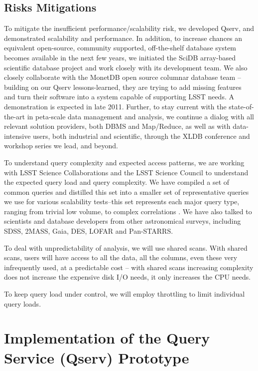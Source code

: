 \documentclass[DM,lsstdraft,toc]{lsstdoc}
\begin{document}
\subsection{Risks Mitigations}\label{risks-mitigations}

To mitigate the insufficient performance/scalability risk, we developed
Qserv, and demonstrated scalability and performance. In addition, to
increase chances an equivalent open-source, community supported,
off-the-shelf database system becomes available in the next few years,
we initiated the SciDB array-based scientific database project and work
closely with its development team. We also closely collaborate with the
MonetDB open source columnar database team -- building on our Qserv
lessons-learned, they are trying to add missing features and turn their
software into a system capable of supporting LSST needs. A demonstration
is expected in late 2011. Further, to stay current with the
state-of-the-art in peta-scale data management and analysis, we continue
a dialog with all relevant solution providers, both DBMS and Map/Reduce,
as well as with data-intensive users, both industrial and scientific,
through the XLDB conference and workshop series
we lead, and beyond.

To understand query complexity and expected access patterns, we are
working with LSST Science Collaborations and the LSST Science Council to
understand the expected query load and query complexity. We have
compiled a set of common queries \citep{CommonQueries} and distilled
this set into a smaller set of representative queries we use for various
scalability tests--this set represents each major query type, ranging
from trivial low volume, to complex correlations \citep{PerfTests}. We
have also talked to scientists and database developers from other
astronomical surveys, including SDSS, 2MASS, Gaia, DES, LOFAR and
Pan-STARRS.

To deal with unpredictability of analysis, we will use shared scans.
With shared scans, users will have access to all the data, all the
columns, even these very infrequently used, at a predictable cost --
with shared scans increasing complexity does not increase the expensive
disk I/O needs, it only increases the CPU needs.

To keep query load under control, we will employ throttling to limit
individual query loads.

\section{Implementation of the Query Service (Qserv)
Prototype}\label{implementation}
\end{document}
